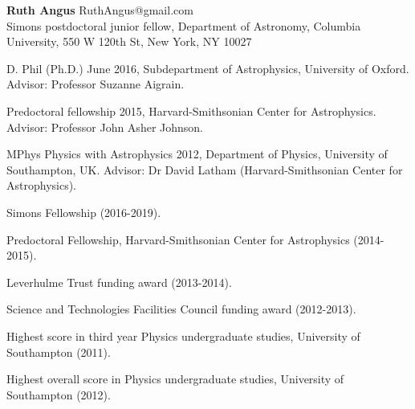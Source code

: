 \documentclass[12pt,letterpaper]{article}
\begin{document}
\thispagestyle{empty}\sloppy\sloppypar\raggedbottom

\textbf{\Large Ruth Angus} \hfill
\textsf{\small RuthAngus@gmail.com} \\[0.5ex]
Simons postdoctoral junior fellow, Department of Astronomy, Columbia
University, 550 W 120th St, New York, NY 10027\\[0.5ex]

\begin{list}{}{\cvlist}
\item
D. Phil (Ph.D.) June 2016, Subdepartment of Astrophysics, University of
Oxford.
Advisor: Professor Suzanne Aigrain.
\item
Predoctoral fellowship 2015, Harvard-Smithsonian Center for Astrophysics.
Advisor: Professor John Asher Johnson.
\item
MPhys Physics with Astrophysics 2012, Department of Physics, University of
Southampton, UK. Advisor: Dr David Latham (Harvard-Smithsonian Center for
Astrophysics).
\end{list}

\begin{list}{}{\cvlist}
\item
Simons Fellowship (2016-2019).
\item
Predoctoral Fellowship, Harvard-Smithsonian Center for Astrophysics
(2014-2015).
\item
Leverhulme Trust funding award (2013-2014).
\item
Science and Technologies Facilities Council funding award (2012-2013).
\item
Highest score in third year Physics undergraduate studies, University of
Southampton (2011).
\item
Highest overall score in Physics undergraduate studies, University of
Southampton (2012).
\end{list}

\end{document}
